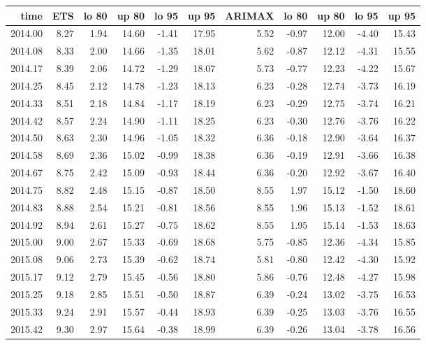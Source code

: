 \documentclass[10pt,a4paper]{article}\usepackage[]{graphicx}\usepackage[]{color}
\begin{document}
\begin{table}[ht]
\centering
\begin{tabular}{rrrrrrrrrrr}
  \hline
time & ETS  & lo 80 & up 80 & lo 95 & up 95 & ARIMAX  & lo 80 & up 80 & lo 95 & up 95 \\ 
  \hline
2014.00 & 8.27 & 1.94 & 14.60 & -1.41 & 17.95 & 5.52 & -0.97 & 12.00 & -4.40 & 15.43 \\ 
  2014.08 & 8.33 & 2.00 & 14.66 & -1.35 & 18.01 & 5.62 & -0.87 & 12.12 & -4.31 & 15.55 \\ 
  2014.17 & 8.39 & 2.06 & 14.72 & -1.29 & 18.07 & 5.73 & -0.77 & 12.23 & -4.22 & 15.67 \\ 
  2014.25 & 8.45 & 2.12 & 14.78 & -1.23 & 18.13 & 6.23 & -0.28 & 12.74 & -3.73 & 16.19 \\ 
  2014.33 & 8.51 & 2.18 & 14.84 & -1.17 & 18.19 & 6.23 & -0.29 & 12.75 & -3.74 & 16.21 \\ 
  2014.42 & 8.57 & 2.24 & 14.90 & -1.11 & 18.25 & 6.23 & -0.30 & 12.76 & -3.76 & 16.22 \\ 
  2014.50 & 8.63 & 2.30 & 14.96 & -1.05 & 18.32 & 6.36 & -0.18 & 12.90 & -3.64 & 16.37 \\ 
  2014.58 & 8.69 & 2.36 & 15.02 & -0.99 & 18.38 & 6.36 & -0.19 & 12.91 & -3.66 & 16.38 \\ 
  2014.67 & 8.75 & 2.42 & 15.09 & -0.93 & 18.44 & 6.36 & -0.20 & 12.92 & -3.67 & 16.40 \\ 
  2014.75 & 8.82 & 2.48 & 15.15 & -0.87 & 18.50 & 8.55 & 1.97 & 15.12 & -1.50 & 18.60 \\ 
  2014.83 & 8.88 & 2.54 & 15.21 & -0.81 & 18.56 & 8.55 & 1.96 & 15.13 & -1.52 & 18.61 \\ 
  2014.92 & 8.94 & 2.61 & 15.27 & -0.75 & 18.62 & 8.55 & 1.95 & 15.14 & -1.53 & 18.63 \\ 
  2015.00 & 9.00 & 2.67 & 15.33 & -0.69 & 18.68 & 5.75 & -0.85 & 12.36 & -4.34 & 15.85 \\ 
  2015.08 & 9.06 & 2.73 & 15.39 & -0.62 & 18.74 & 5.81 & -0.80 & 12.42 & -4.30 & 15.92 \\ 
  2015.17 & 9.12 & 2.79 & 15.45 & -0.56 & 18.80 & 5.86 & -0.76 & 12.48 & -4.27 & 15.98 \\ 
  2015.25 & 9.18 & 2.85 & 15.51 & -0.50 & 18.87 & 6.39 & -0.24 & 13.02 & -3.75 & 16.53 \\ 
  2015.33 & 9.24 & 2.91 & 15.57 & -0.44 & 18.93 & 6.39 & -0.25 & 13.03 & -3.76 & 16.55 \\ 
  2015.42 & 9.30 & 2.97 & 15.64 & -0.38 & 18.99 & 6.39 & -0.26 & 13.04 & -3.78 & 16.56 \\ 

\end{tabular}
\end{table}
\end{document}
